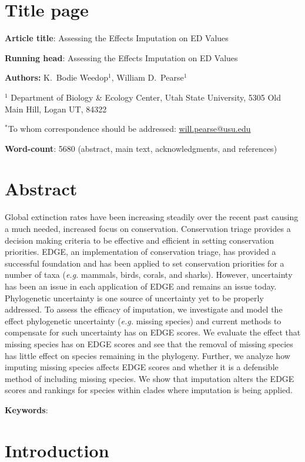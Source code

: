 \documentclass[12pt,english]{article}
\begin{document}
\setlength{\parindent}{0pt}
\section*{Title page}

\textbf{Article title}: Assessing the Effects Imputation on ED Values

\textbf{Running head}: Assessing the Effects Imputation on ED Values

\textbf{Authors:} K.\ Bodie Weedop$^{1}$, William D.\ Pearse$^{1}$\

$^1$ Department of Biology \& Ecology Center, Utah State University,
5305 Old Main Hill, Logan UT, 84322

$^*$To whom correspondence should be addressed:
\url{will.pearse@usu.edu}

\textbf{Word-count}: 5680 (abstract, main text, acknowledgments, and
  references)

\clearpage
\section*{Abstract}

Global extinction rates have been increasing steadily over the recent past
causing a much needed, increased focus on conservation. Conservation triage
provides a decision making criteria to be effective and efficient in setting
conservation priorities. EDGE, an implementation of conservation triage, has
provided a successful foundation and has been applied to set conservation
priorities for a number of taxa (\emph{e.g.} mammals, birds, corals, and
sharks). However, uncertainty has been an issue in each application of EDGE and
remains an issue today. Phylogenetic uncertainty is one source of uncertainty
yet to be properly addressed. To assess the efficacy of imputation, we
investigate and model the effect phylogenetic uncertainty (\emph{e.g.} missing
species) and current methods to compensate for such uncertainty has on EDGE
scores. We evaluate the effect that missing species has on EDGE scores and see
that the removal of missing species has little effect on species remaining in
the phylogeny. Further, we analyze how imputing missing species affects EDGE
scores and whether it is a defensible method of including missing species. We
show that imputation alters the EDGE scores and rankings for species within
clades where imputation is being applied.

\textbf{Keywords}: 

\clearpage
\section*{Introduction}
\end{document}
